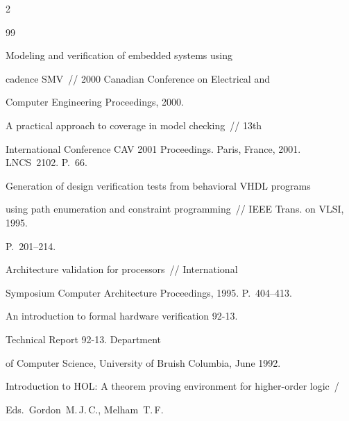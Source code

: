 \begin{multicols}{2}
{{\begin{thebibliography}{99}


Modeling and veri\-fi\-cation of embedded systems using


cadence SMV~//  2000 Canadian Conference on Electrical and


Computer Engineering Proceedings, 2000.









A practical approach to coverage in model checking~// 13th


International Conference CAV 2001 Proceedings. Paris, France, 2001. LNCS~2102. P.~66.









Generation of design verification tests from behavioral VHDL programs


using path enumeration and constraint programming~// IEEE Trans. on VLSI, 1995.


 P.~201--214.









Architecture validation for processors~// International


Symposium Computer Architecture Proceedings, 1995. P.~404--413.









An introduction to formal hardware verification 92-13.


Technical Report 92-13.  Department


of Computer Science, University of Bruish Columbia, June 1992.







Introduction to HOL: A theorem proving environment for higher-order logic~/


Eds.\ Gordon~M.\,J.\,C., Melham~T.\,F.



\end{thebibliography}}}
\end{multicols}
